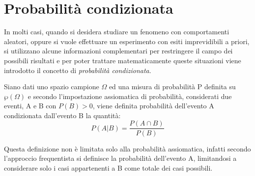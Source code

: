 \documentclass[a4paper,12pt, oneside]{book}
\begin{document}
\section{Probabilità condizionata}
In molti casi, quando si desidera studiare un fenomeno con comportamenti aleatori, oppure si vuole effettuare
un esperimento con esiti imprevidibili a priori, si utilizzano alcune informazioni complementari per restringere 
il campo dei possibili risultati e per poter trattare matematicamente queste situazioni viene introdotto
il concetto di \emph{probabilità condizionata}.

\begin{definizione}
Siano dati uno spazio campione $\Omega$ ed una misura di probabilità P definita su $\wp(\Omega)$ e
secondo l'impostazione assiomatica di probabilità, considerati due eventi, A e B con $P(B)>0$,
viene definita  probabilità dell'evento A condizionata dall'evento B la quantità:
\[P(A|B) = \frac{P(A\cap B)}{P(B)} \]
\end{definizione}
Questa definizione non è limitata solo alla probabilità assiomatica, infatti secondo l'approccio frequentista 
si definisce la probabilità dell'evento A, limitandosi a considerare solo i casi appartenenti a B come totale dei casi possibili.
\end{document}
